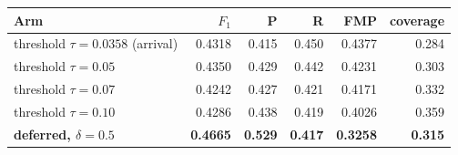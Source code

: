 \begin{tabular}{lrrrrr}
\toprule
Arm & $F_1$ & P & R & FMP & coverage \\
\midrule
threshold $\tau=0.0358$ (arrival) & 0.4318 & 0.415 & 0.450 & 0.4377 & 0.284 \\
threshold $\tau=0.05$ & 0.4350 & 0.429 & 0.442 & 0.4231 & 0.303 \\
threshold $\tau=0.07$ & 0.4242 & 0.427 & 0.421 & 0.4171 & 0.332 \\
threshold $\tau=0.10$ & 0.4286 & 0.438 & 0.419 & 0.4026 & 0.359 \\
\midrule
\textbf{deferred, $\delta=0.5$} & \textbf{0.4665} & \textbf{0.529} & \textbf{0.417} & \textbf{0.3258} & \textbf{0.315} \\
\bottomrule
\end{tabular}